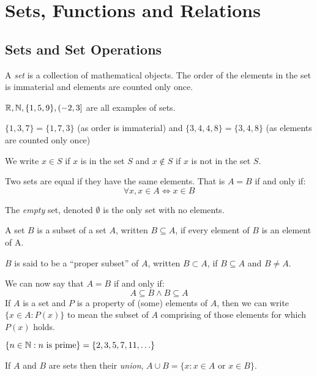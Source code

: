 \documentclass[../main.tex]{subfiles}
\begin{document}
\chapter{Sets, Functions and Relations}
\section{Sets and Set Operations}
\begin{definition}[Set]
  A \textit{set} is a collection of mathematical objects. The order of the elements in the set is immaterial and elements are counted only once.
\end{definition}
\begin{example}
  $\mathbb{R}, \mathbb{N}, \{1, 5, 9\}, (-2, 3]$ are all examples of sets.
\end{example}
\begin{example}
  $\{1, 3, 7\} = \{1, 7, 3\}$ (as order is immaterial) and $\{3, 4, 4, 8\} = \{3, 4, 8\}$ (as elements are counted only once)
\end{example}
\begin{remark}[Notation]
  We write $x \in S$ if $x$ is in the set $S$ and $x \notin S$ if $x$ is not in the set $S$.
\end{remark}
Two sets are equal if they have the same elements.
That is $A = B$ if and only if:
\[
  \forall x, x \in A \iff x \in B
\]
\begin{definition}
  The \textit{empty} set, denoted $\emptyset$ is the only set with no elements.
\end{definition}
\begin{definition}[Subset]
A set $B$ is a subset of a set $A$, written $B \subseteq A$, if every element of $B$ is an element of A.

$B$ is said to be a ``proper subset'' of $A$, written $B \subset A$, if $B \subseteq A$ and $B \neq A$.
\end{definition}
We can now say that $A = B$ if and only if:
\[
  A \subseteq B \land B \subseteq A
\]
If $A$ is a set and $P$ is a property of (some) elements of $A$, then we can write $\{x \in A: P(x)\}$ to mean the subset of $A$ comprising of those elements for which $P(x)$ holds.
\begin{example}
  $\{n \in \mathbb{N} : n \text{ is prime}\} = \{2, 3, 5, 7, 11, \ldots\}$
\end{example}
\begin{definition}[Union]
  If $A$ and $B$ are sets then their \textit{union}, $A \cup B = \{x: x \in A \text{ or } x \in B\}$.
\end{definition}
\end{document}
